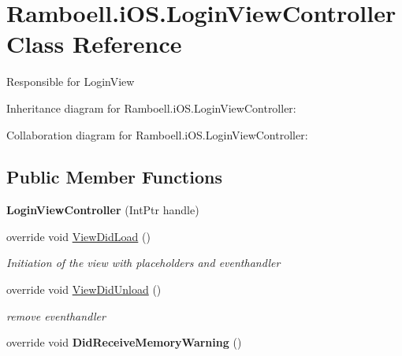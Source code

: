 \hypertarget{class_ramboell_1_1i_o_s_1_1_login_view_controller}{}\section{Ramboell.\+i\+O\+S.\+Login\+View\+Controller Class Reference}
\label{class_ramboell_1_1i_o_s_1_1_login_view_controller}


Responsible for Login\+View  




Inheritance diagram for Ramboell.\+i\+O\+S.\+Login\+View\+Controller\+:


Collaboration diagram for Ramboell.\+i\+O\+S.\+Login\+View\+Controller\+:
\subsection*{Public Member Functions}
\begin{DoxyCompactItemize}
\item 
\mbox{\label{class_ramboell_1_1i_o_s_1_1_login_view_controller_ad47b0bfc828ac5009b16abe51283a6d6}} 
{\bfseries Login\+View\+Controller} (Int\+Ptr handle)
\item 
override void \hyperlink{class_ramboell_1_1i_o_s_1_1_login_view_controller_a43dbaf2dd54a2a4884ca87d26697f375}{View\+Did\+Load} ()
\begin{DoxyCompactList}\small\item\em Initiation of the view with placeholders and eventhandler \end{DoxyCompactList}\item 
override void \hyperlink{class_ramboell_1_1i_o_s_1_1_login_view_controller_ac6f5b00fbb4861aa7e87e21c25e76c55}{View\+Did\+Unload} ()
\begin{DoxyCompactList}\small\item\em remove eventhandler \end{DoxyCompactList}\item 
\mbox{\label{class_ramboell_1_1i_o_s_1_1_login_view_controller_a33baa98e9632062555dc7cc43d3f6d1a}} 
override void {\bfseries Did\+Receive\+Memory\+Warning} ()
\end{DoxyCompactItemize}
